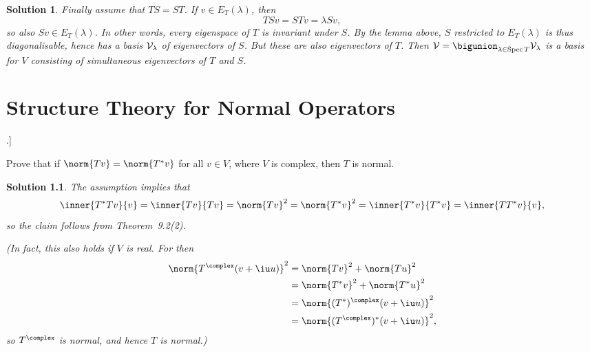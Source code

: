\documentclass[article, a4paper, 11pt, oneside]{memoir}
\numberwithin{equation}{chapter}
\renewenvironment{exerciseframed}[1][]{%
    \setsepchar{.}%
    \readlist*\mylist{#1}%
    \def\exlabel{\mylist[1].\mylist[2]}%
    \begin{exerciseframed*}[\exlabel]%
    \label{ex:#1}%
}{%
    \end{exerciseframed*}%
}
\theoremstyle{nonumberplain}
\newtheorem{solution}{Solution}
\begin{document}
\begin{solution}
    Finally assume that $TS = ST$. If $v \in E_T(\lambda)$, then
    \begin{equation*}
        TSv
            = STv
            = \lambda Sv,
    \end{equation*}
    so also $Sv \in E_T(\lambda)$. In other words, every eigenspace of $T$ is invariant under $S$. By the lemma above, $S$ restricted to $E_T(\lambda)$ is thus diagonalisable, hence has a basis $\mathcal{V}_\lambda$ of eigenvectors of $S$. But these are also eigenvectors of $T$. Then $\calV = \bigunion_{\lambda \in \spec T} \calV_\lambda$ is a basis for $V$ consisting of simultaneous eigenvectors of $T$ and $S$.
\end{solution}


\addtocounter{chapter}{1}
\chapter{Structure Theory for Normal Operators}

\begin{exerciseframed}[10.5]
    Prove that if $\norm{Tv} = \norm{T^*v}$ for all $v \in V$, where $V$ is complex, then $T$ is normal.
\end{exerciseframed}

\begin{solution}
    The assumption implies that
    \begin{equation*}
        \inner{T^*Tv}{v}
            = \inner{Tv}{Tv}
            = \norm{Tv}^2
            = \norm{T^*v}^2
            = \inner{T^*v}{T^*v}
            = \inner{TT^*v}{v},
    \end{equation*}
    so the claim follows from Theorem~9.2(2).

    (In fact, this also holds if $V$ is real. For then
    \begin{align*}
        \norm{T^\complex(v + \iu u)}^2
            &= \norm{Tv}^2 + \norm{Tu}^2 \\
            &= \norm{T^*v}^2 + \norm{T^*u}^2 \\
            &= \norm{(T^*)^\complex(v + \iu u)}^2 \\
            &= \norm{(T^\complex)^*(v + \iu u)}^2,
    \end{align*}
    so $T^\complex$ is normal, and hence $T$ is normal.)
\end{solution}
\end{document}
